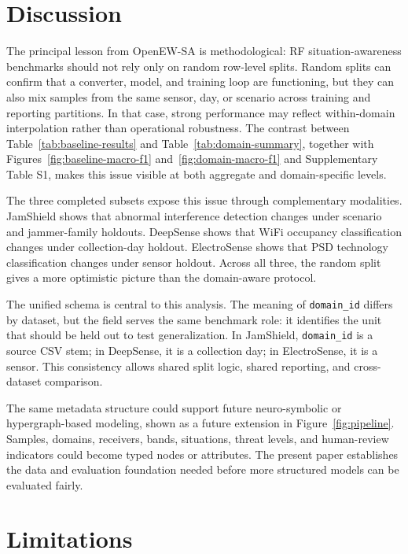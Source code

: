 \documentclass{ieeeaccess}
\newcommand{\artifact}[1]{\texttt{#1}}
\begin{document}
\section{Discussion}

The principal lesson from OpenEW-SA is methodological: RF situation-awareness benchmarks should not rely only on random row-level splits. Random splits can confirm that a converter, model, and training loop are functioning, but they can also mix samples from the same sensor, day, or scenario across training and reporting partitions. In that case, strong performance may reflect within-domain interpolation rather than operational robustness. The contrast between Table~\ref{tab:baseline-results} and Table~\ref{tab:domain-summary}, together with Figures~\ref{fig:baseline-macro-f1} and~\ref{fig:domain-macro-f1} and Supplementary Table S1, makes this issue visible at both aggregate and domain-specific levels.

The three completed subsets expose this issue through complementary modalities. JamShield shows that abnormal interference detection changes under scenario and jammer-family holdouts. DeepSense shows that WiFi occupancy classification changes under collection-day holdout. ElectroSense shows that PSD technology classification changes under sensor holdout. Across all three, the random split gives a more optimistic picture than the domain-aware protocol.

The unified schema is central to this analysis. The meaning of \artifact{domain\_id} differs by dataset, but the field serves the same benchmark role: it identifies the unit that should be held out to test generalization. In JamShield, \artifact{domain\_id} is a source CSV stem; in DeepSense, it is a collection day; in ElectroSense, it is a sensor. This consistency allows shared split logic, shared reporting, and cross-dataset comparison.

The same metadata structure could support future neuro-symbolic or hypergraph-based modeling, shown as a future extension in Figure~\ref{fig:pipeline}. Samples, domains, receivers, bands, situations, threat levels, and human-review indicators could become typed nodes or attributes. The present paper establishes the data and evaluation foundation needed before more structured models can be evaluated fairly.

\section{Limitations}
\end{document}
